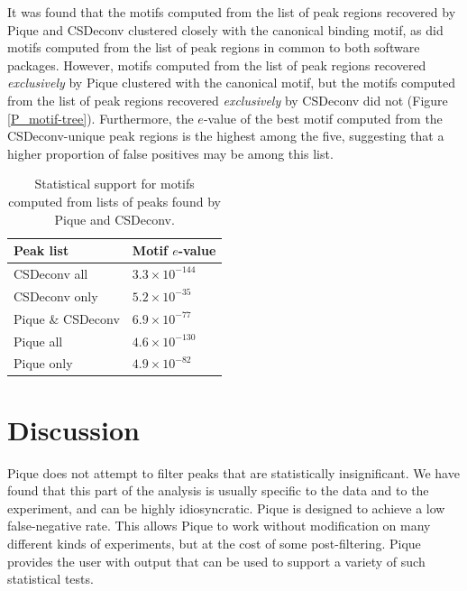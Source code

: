 \begin{refsection}
It was found that the motifs computed from the list of peak regions
recovered by Pique and CSDeconv clustered closely with the canonical
binding motif, as did motifs computed from the list of peak regions in
common to both software packages. However, motifs computed from the
list of peak regions recovered {\em exclusively} by Pique clustered
with the canonical motif, but the motifs computed from the list of
peak regions recovered {\em exclusively} by CSDeconv did not
(Figure \ref{P_motif-tree}). Furthermore, the $e$-value of the best motif
computed from the CSDeconv-unique peak regions is the highest among
the five, suggesting that a higher proportion of false positives may
be among this list.

\begin{table}
  \begin{center}
    \begin{tabular}{ l l }
      Peak list & Motif $e$-value \\
      \hline
      CSDeconv all      & $3.3 \times 10^{-144}$ \\
      CSDeconv only     & $5.2 \times 10^{-35}$ \\
      Pique \& CSDeconv & $6.9 \times 10^{-77}$ \\
      Pique all         & $4.6 \times 10^{-130}$ \\
      Pique only        & $4.9 \times 10^{-82}$ \\
    \end{tabular}
  \end{center}
  \caption{Statistical support for motifs computed from lists of peaks 
    found by Pique and CSDeconv.}
\end{table}



\section{Discussion}

Pique does not attempt to filter peaks that are statistically
insignificant. We have found that this part of the analysis is usually
specific to the data and to the experiment, and can be highly
idiosyncratic. Pique is designed to achieve a low false-negative
rate. This allows Pique to work without modification on many different
kinds of experiments, but at the cost of some post-filtering. Pique
provides the user with output that can be used to support a variety of
such statistical tests.


\end{refsection}
